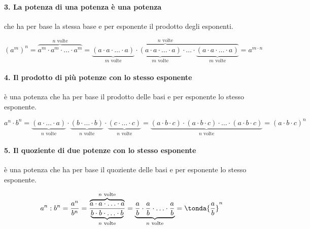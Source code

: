 \vspace{-1.5em}
\paragraph{3. La potenza di una potenza è una potenza} 
che ha per base la stessa base e per esponente il prodotto degli esponenti.

\[(a^m)^n =\overbrace{a^m\cdot a^m\cdot\ldots\cdot a^m}^{n\text{ volte}}%
 =\overbrace{\underbrace{(a\cdot a\cdot\ldots\cdot a)}_{m\text{ 
volte}}\cdot%
   \underbrace{(a\cdot a\cdot\ldots\cdot a)}_{m\text{ 
volte}}\cdot\ldots\cdot%
   \underbrace{(a\cdot a\cdot\ldots\cdot a)}_{m\text{ 
volte}}}^{n\text{ volte}}%
   =a^{m\cdot n}\]
   
\vspace{-1.5em}
\paragraph{4. Il prodotto di più potenze con lo stesso esponente} 
è una potenza che ha per base il prodotto delle basi e per esponente lo stesso
esponente.

\[a^n \cdot b^n=
  \underbrace{(a \cdot \ldots \cdot a)}_{n\text{ volte}} \cdot
  \underbrace{(b \cdot \ldots \cdot b)}_{n\text{ volte}} \cdot
  \underbrace{(c \cdot \ldots \cdot c)}_{n\text{ volte}}=
  \underbrace{(a \cdot b \cdot c) \cdot (a \cdot b \cdot c) \cdot
              \ldots \cdot (a \cdot b \cdot c)}_{n\text{ volte}}=
   (a \cdot b \cdot c)^n\]
   
\vspace{-1.5em}
\paragraph{5. Il quoziente di due potenze con lo stesso esponente} 
è una potenza che ha per base il quoziente delle basi e per esponente lo 
stesso esponente.

\[a^n : b^n = \frac{a^n}{b^n} = 
  \frac{\overbrace{a\cdot a\cdot\ldots\cdot a}^{n\text{ volte}} }
       {\underbrace{b\cdot b\cdot\ldots\cdot b}_{n\text{ volte}}}=
  \underbrace{\frac{a}{b}\cdot \frac{a}{b}\cdot\ldots\cdot
              \frac{a}{b}}_{n\text{ volte}}=
   \tonda{\frac{a}{b}}^n\]

